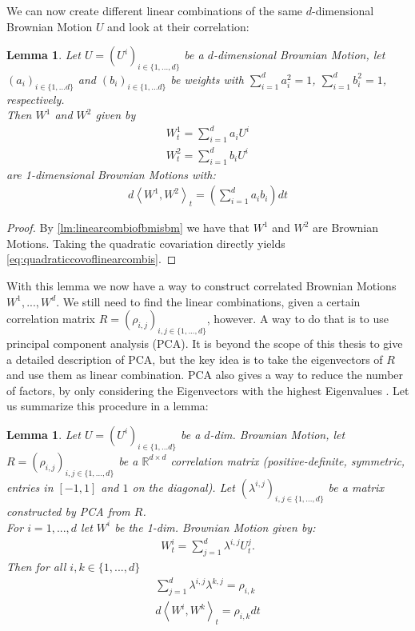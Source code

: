 \documentclass[12pt]{article}
\newtheorem{lemma}[theorem]{Lemma}
\begin{document}
	We can now create different linear combinations of the same $d$-dimensional Brownian Motion $U$ and look at their correlation:
	\begin{lemma}
		Let $U = (U^i)_{i\in\{1, ..., d\}}$ be a $d$-dimensional Brownian Motion, let $(a_i)_{i\in\{1,...d\}}$ and $(b_i)_{i\in\{1,...d\}}$ be weights with $\sum_{i=1}^{d}a^2_i = 1$, $\sum_{i=1}^{d}b^2_i = 1$, respectively.\\
		Then $W^1$ and $W^2$ given by 
		\begin{align*}
			W^1_t = \sum_{i=1}^{d}a_iU^i\\
			W^2_t = \sum_{i=1}^{d}b_iU^i
		\end{align*}
		are 1-dimensional Brownian Motions with:
		\begin{align}\label{eq:quadraticcovoflinearcombis}
			d\left\langle W^{1}, W^{2} \right\rangle_t = \left(\sum_{i=1}^{d}a_ib_i \right)dt
		\end{align}
	\end{lemma}
	\begin{proof}
		By \cref{lm:linearcombiofbmisbm} we have that $W^1$ and $W^2$ are Brownian Motions. Taking the quadratic covariation directly yields \cref{eq:quadraticcovoflinearcombis}.
	\end{proof}
	With this lemma we now have a way to construct correlated Brownian Motions $W^1, ..., W^d$. We still need to find the linear combinations, given a certain correlation matrix $R = (\rho_{i,j})_{i,j\in\{1,...,d\}}$, however. A way to do that is to use principal component analysis (PCA). It is beyond the scope of this thesis to give a detailed description of PCA, but the key idea is to take the eigenvectors of $R$ and use them as linear combination. PCA also gives a way to reduce the number of factors, by only considering the Eigenvectors with the highest Eigenvalues \cite{FriesBook}. Let us summarize this procedure in a lemma:
	\begin{lemma}
		Let $U=(U^i)_{i\in\{1, ... d\}}$ be a $d$-dim. Brownian Motion, let $R=(\rho_{i,j})_{i,j\in\{1,...,d\}}$ be a $\mathbb{R}^{d\times d}$ correlation matrix (positive-definite, symmetric, entries in $\left[-1,1\right]$ and $1$ on the diagonal). Let $(\lambda^{i,j})_{i,j\in\{1,...,d\}}$ be a matrix constructed by PCA from $R$.\\
		For $i=1,..., d$ let $W^i$ be the 1-dim. Brownian Motion given by:
		\begin{align*}
			W^i_t = \sum_{j=1}^{d}\lambda^{i,j}U^j_t.
		\end{align*}
		Then for all $i, k \in \{1, ..., d\}$ 
		\begin{align*}
			\sum_{j=1}^{d}\lambda^{i,j}\lambda^{k,j} = \rho_{i,k}\\
			d\left\langle W^{i}, W^{k} \right\rangle_t = \rho_{i,k}dt
		\end{align*}
	\end{lemma}
\end{document}
